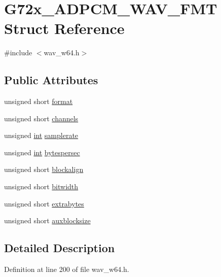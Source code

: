 \hypertarget{struct_g72x___a_d_p_c_m___w_a_v___f_m_t}{}\section{G72x\+\_\+\+A\+D\+P\+C\+M\+\_\+\+W\+A\+V\+\_\+\+F\+MT Struct Reference}
\label{struct_g72x___a_d_p_c_m___w_a_v___f_m_t}


{\ttfamily \#include $<$wav\+\_\+w64.\+h$>$}

\subsection*{Public Attributes}
\begin{DoxyCompactItemize}
\item 
unsigned short \hyperlink{struct_g72x___a_d_p_c_m___w_a_v___f_m_t_ab9445f1c1fa7a932266e9b4ce7baedfd}{format}
\item 
unsigned short \hyperlink{struct_g72x___a_d_p_c_m___w_a_v___f_m_t_a250906710575f015facc68fd95d3c369}{channels}
\item 
unsigned \hyperlink{xmltok_8h_a5a0d4a5641ce434f1d23533f2b2e6653}{int} \hyperlink{struct_g72x___a_d_p_c_m___w_a_v___f_m_t_a72e67d6d7b79218c15089b7b1ad46951}{samplerate}
\item 
unsigned \hyperlink{xmltok_8h_a5a0d4a5641ce434f1d23533f2b2e6653}{int} \hyperlink{struct_g72x___a_d_p_c_m___w_a_v___f_m_t_a54de4421ecc11371cef9cd696ee7a6a4}{bytespersec}
\item 
unsigned short \hyperlink{struct_g72x___a_d_p_c_m___w_a_v___f_m_t_ab7f5a2e60e7aa6a2f869181d5784b831}{blockalign}
\item 
unsigned short \hyperlink{struct_g72x___a_d_p_c_m___w_a_v___f_m_t_ad84c811a3263e7ec83f19b337f117eb4}{bitwidth}
\item 
unsigned short \hyperlink{struct_g72x___a_d_p_c_m___w_a_v___f_m_t_a70c544b09803f37545eaf9f22fbe642f}{extrabytes}
\item 
unsigned short \hyperlink{struct_g72x___a_d_p_c_m___w_a_v___f_m_t_a1adcee5a5a4854c92317665aa4ce7554}{auxblocksize}
\end{DoxyCompactItemize}


\subsection{Detailed Description}


Definition at line 200 of file wav\+\_\+w64.\+h.



